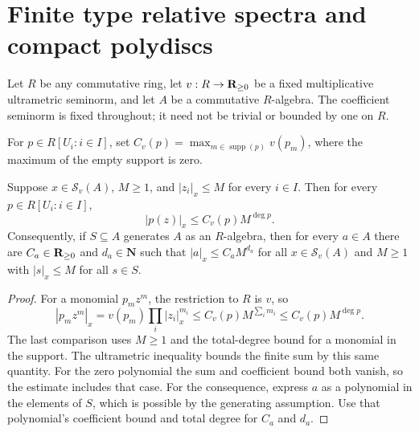 \section{Finite type relative spectra and compact polydiscs}
\label{sec:relative-finite-type-spectra}

Let $R$ be any commutative ring, let $v:R\to\mathbf{R}_{\ge0}$ be a fixed
multiplicative ultrametric seminorm, and let $A$ be a commutative $R$-algebra.
The coefficient seminorm is fixed throughout; it need not be trivial or bounded
by one on $R$.

\begin{definition}\label{spectrum:polynomial-coefficient-bound}
\leanok
For $p\in R[U_i:i\in I]$, set
$C_v(p)=\max_{m\in\operatorname{supp}(p)}v(p_m)$,
where the maximum of the empty support is zero.
\end{definition}

\begin{lemma}
\label{spectrum:relative-polynomial-estimate}
\leanok
{}
Suppose $x\in\mathcal S_v(A)$, $M\ge1$, and $|z_i|_x\le M$ for every $i\in I$.
Then for every $p\in R[U_i:i\in I]$,
\[
 |p(z)|_x\le C_v(p)M^{\deg p}.
\]
Consequently, if $S\subseteq A$ generates $A$ as an $R$-algebra, then
for every $a\in A$ there are $C_a\in\mathbf{R}_{\ge0}$ and $d_a\in\mathbf N$
such that $|a|_x\le C_aM^{d_a}$ for all $x\in\mathcal S_v(A)$ and $M\ge1$
with $|s|_x\le M$ for all $s\in S$.
\end{lemma}
\begin{proof}
For a monomial $p_mz^m$, the restriction to $R$ is $v$, so
\[
 |p_mz^m|_x=v(p_m)\prod_i|z_i|_x^{m_i}
 \le C_v(p)M^{\sum_i m_i}\le C_v(p)M^{\deg p}.
\]
The last comparison uses $M\ge1$ and the total-degree bound for a monomial
in the support. The ultrametric inequality bounds the finite sum by this
same quantity. For the zero polynomial the sum and coefficient bound both
vanish, so the estimate includes that case.
For the consequence, express $a$ as a polynomial in the elements of $S$,
which is possible by the generating assumption. Use that polynomial's
coefficient bound and total degree for $C_a$ and $d_a$.
\end{proof}


